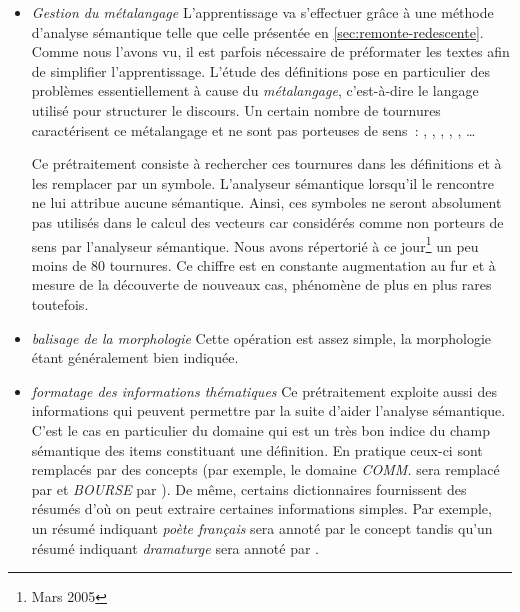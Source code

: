 \begin{itemize}
    
\item \emph{Gestion du métalangage} L'apprentissage va s'effectuer
  grâce à une méthode d'analyse sémantique telle que celle présentée
  en \ref{sec:remonte-redescente}. Comme nous l'avons vu, il est
  parfois nécessaire de préformater les textes afin de simplifier
  l'apprentissage. L'étude des définitions pose en particulier des
  problèmes essentiellement à cause du \emph{métalangage},
  c'est-à-dire le langage utilisé pour structurer le discours.  Un
  certain nombre de tournures caractérisent ce métalangage et ne sont
  pas porteuses de sens~: , ,
  , , ,
  \ldots
  
  Ce prétraitement consiste à rechercher ces tournures dans les
  définitions et à les remplacer par un symbole.  L'analyseur
  sémantique lorsqu'il le rencontre ne lui attribue aucune sémantique.
  Ainsi, ces symboles ne seront absolument pas utilisés dans le calcul
  des vecteurs car considérés comme non porteurs de sens par
  l'analyseur sémantique.  Nous avons répertorié à ce
  jour\footnote{Mars 2005} un peu moins de 80 tournures. Ce chiffre
  est en constante augmentation au fur et à mesure de la découverte de
  nouveaux cas, phénomène de plus en plus rares toutefois.
  
\item \emph{balisage de la morphologie} Cette opération est assez
  simple, la morphologie étant généralement bien indiquée.
  
\item \emph{formatage des informations thématiques} Ce prétraitement
  exploite aussi des informations qui peuvent permettre par la suite
  d'aider l'analyse sémantique. C'est le cas en particulier du domaine
  qui est un très bon indice du  champ
  sémantique des items constituant une définition. En pratique ceux-ci
  sont remplacés par des concepts (par exemple, le domaine
  \emph{COMM.} sera remplacé par  et \emph{BOURSE} par
  ). De même, certains dictionnaires fournissent des
  résumés d'où on peut extraire certaines informations simples. Par
  exemple, un résumé indiquant \emph{poète français} sera annoté par
  le concept  tandis qu'un résumé indiquant
  \emph{dramaturge} sera annoté par .

\end{itemize}


